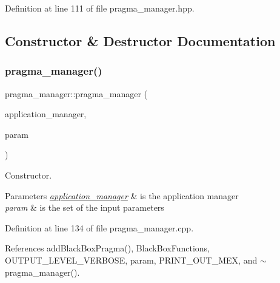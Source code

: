 Definition at line 111 of file pragma\+\_\+manager.\+hpp.



\subsection{Constructor \& Destructor Documentation}
\mbox{\label{classpragma__manager_abe4b519b37e161145fdc9b7f3eec8dc7}} 
\subsubsection{\texorpdfstring{pragma\+\_\+manager()}{pragma\_manager()}}
{\footnotesize\ttfamily pragma\+\_\+manager\+::pragma\+\_\+manager (\begin{DoxyParamCaption}\item[{const \hyperlink{application__manager_8hpp_a04ccad4e5ee401e8934306672082c180}{application\+\_\+manager\+Ref}}]{application\+\_\+manager,  }\item[{const \hyperlink{Parameter_8hpp_a37841774a6fcb479b597fdf8955eb4ea}{Parameter\+Const\+Ref}}]{param }\end{DoxyParamCaption})}



Constructor. 


\begin{DoxyParams}{Parameters}
{\em \hyperlink{classapplication__manager}{application\+\_\+manager}} & is the application manager \\
\hline
{\em param} & is the set of the input parameters \\
\hline
\end{DoxyParams}


Definition at line 134 of file pragma\+\_\+manager.\+cpp.



References add\+Black\+Box\+Pragma(), Black\+Box\+Functions, O\+U\+T\+P\+U\+T\+\_\+\+L\+E\+V\+E\+L\+\_\+\+V\+E\+R\+B\+O\+SE, param, P\+R\+I\+N\+T\+\_\+\+O\+U\+T\+\_\+\+M\+EX, and $\sim$pragma\+\_\+manager().

